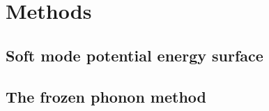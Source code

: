 





\section{Methods}
\subsection{Soft mode potential energy surface}
\subsection{The frozen phonon method}


